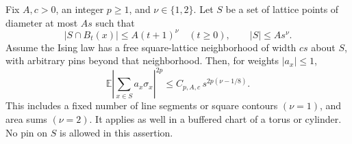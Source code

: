 \begin{lemma}\label{fd:moments}
Fix \(A,c>0\), an integer \(p\ge1\), and \(\nu\in\{1,2\}\).
Let \(S\) be a set of lattice points of diameter at most \(As\) such that
\[
 |S\cap B_t(x)|\le A(t+1)^\nu\quad(t\ge0),
 \qquad |S|\le A s^\nu.
\]
Assume the Ising law has a free square-lattice neighborhood of width
\(cs\) about \(S\), with arbitrary pins beyond that neighborhood.
Then, for weights \(|a_x|\le1\),
\begin{equation}
 \mathbb E\left|\sum_{x\in S}a_x\sigma_x\right|^{2p}
 \le C_{p,A,c}\,s^{2p(\nu-1/8)}.
 \label{fd:moment-bound}
\end{equation}
This includes a fixed number of line segments or square contours
\((\nu=1)\), and area sums \((\nu=2)\).  It applies as well in a
buffered chart of a torus or cylinder.  No pin on \(S\) is allowed in
this assertion.
\end{lemma}

